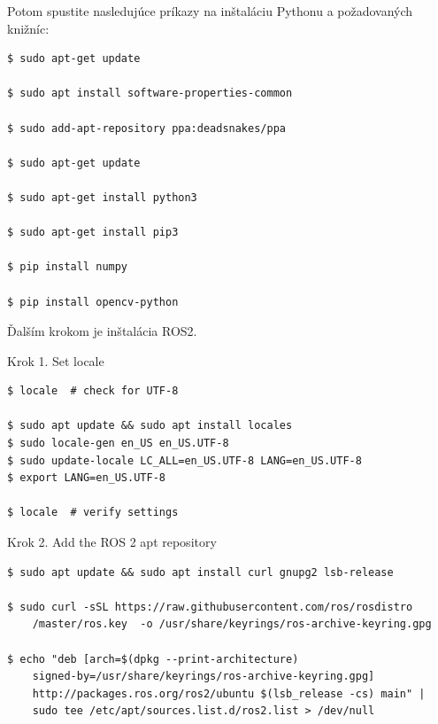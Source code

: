 \documentclass[a4paper]{feidippp}
\begin{document}
\justifying
\noindent
Potom spustite nasledujúce príkazy na inštaláciu Pythonu a požadovaných knižníc:

\begin{lstlisting}
$ sudo apt-get update

$ sudo apt install software-properties-common

$ sudo add-apt-repository ppa:deadsnakes/ppa

$ sudo apt-get update

$ sudo apt-get install python3

$ sudo apt-get install pip3

$ pip install numpy

$ pip install opencv-python

\end{lstlisting}
\vspace{3mm}

\justifying
\noindent
Ďalším krokom je inštalácia ROS2.
\vspace{3mm}

\justifying
\noindent
Krok 1. Set locale
\begin{lstlisting}
$ locale  # check for UTF-8

$ sudo apt update && sudo apt install locales
$ sudo locale-gen en_US en_US.UTF-8
$ sudo update-locale LC_ALL=en_US.UTF-8 LANG=en_US.UTF-8
$ export LANG=en_US.UTF-8
    
$ locale  # verify settings
\end{lstlisting}
\vspace{3mm}

\justifying
\noindent
Krok 2. Add the ROS 2 apt repository
\begin{lstlisting}
$ sudo apt update && sudo apt install curl gnupg2 lsb-release

$ sudo curl -sSL https://raw.githubusercontent.com/ros/rosdistro
    /master/ros.key  -o /usr/share/keyrings/ros-archive-keyring.gpg

$ echo "deb [arch=$(dpkg --print-architecture) 
    signed-by=/usr/share/keyrings/ros-archive-keyring.gpg] 
    http://packages.ros.org/ros2/ubuntu $(lsb_release -cs) main" | 
    sudo tee /etc/apt/sources.list.d/ros2.list > /dev/null
\end{lstlisting}
\vspace{3mm}
\end{document}
